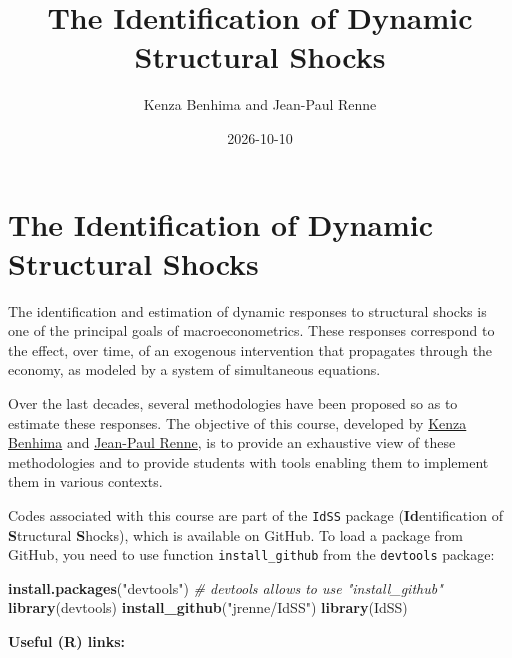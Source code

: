 \documentclass[
  11pt,
]{book}
\title{The Identification of Dynamic Structural Shocks}
\author{Kenza Benhima and Jean-Paul Renne}
\date{2026-10-10}
\newenvironment{Shaded}{\begin{snugshade}}{\end{snugshade}}
\newcommand{\CommentTok}[1]{\textcolor[rgb]{0.56,0.35,0.01}{\textit{#1}}}
\newcommand{\FunctionTok}[1]{\textcolor[rgb]{0.13,0.29,0.53}{\textbf{#1}}}
\newcommand{\NormalTok}[1]{#1}
\newcommand{\StringTok}[1]{\textcolor[rgb]{0.31,0.60,0.02}{#1}}
\theoremstyle{definition}
\theoremstyle{definition}
\theoremstyle{definition}
\theoremstyle{definition}
\theoremstyle{remark}
\begin{document}
\maketitle

{
\setcounter{tocdepth}{1}
\tableofcontents
}
\newcommand{\bv}[1]{\mathbf{#1}}

\chapter*{The Identification of Dynamic Structural Shocks}\label{intro}

The identification and estimation of dynamic responses to structural shocks is one of the principal goals of macroeconometrics. These responses correspond to the effect, over time, of an exogenous intervention that propagates through the economy, as modeled by a system of simultaneous equations.

Over the last decades, several methodologies have been proposed so as to estimate these responses. The objective of this course, developed by \href{https://sites.google.com/site/benhimakenza/}{Kenza Benhima} and \href{https://www.jprenne.com}{Jean-Paul Renne}, is to provide an exhaustive view of these methodologies and to provide students with tools enabling them to implement them in various contexts.

Codes associated with this course are part of the \texttt{IdSS} package (\textbf{Id}entification of \textbf{S}tructural \textbf{S}hocks), which is available on GitHub. To load a package from GitHub, you need to use function \texttt{install\_github} from the \texttt{devtools} package:

\begin{Shaded}
\begin{Highlighting}[]
\FunctionTok{install.packages}\NormalTok{(}\StringTok{"devtools"}\NormalTok{) }\CommentTok{\# devtools allows to use "install\_github"}
\FunctionTok{library}\NormalTok{(devtools)}
\FunctionTok{install\_github}\NormalTok{(}\StringTok{"jrenne/IdSS"}\NormalTok{)}
\FunctionTok{library}\NormalTok{(IdSS)}
\end{Highlighting}
\end{Shaded}

\textbf{Useful (R) links:}
\end{document}
